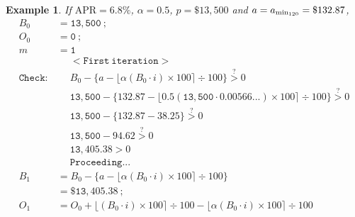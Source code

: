 \documentclass[12pt,letterpaper,oneside]{article}
\newtheorem{example}{Example}[section]
\theoremstyle{remark} %
\begin{document}
	\renewcommand{\rate}{0.00566...}
	\renewcommand{\proportion}{0.5}
	\renewcommand{\amount}{132.87}
	\renewcommand{\balance}{13,500}
	\renewcommand{\interest}{0}
	\renewcommand{\months}{0}
	\renewcommand{\monthsp}{1}
	\renewcommand{\balanceitb}{13,405.38}
	\renewcommand{\interestitb}{38.25}
	\renewcommand{\monthsitb}{1}
	\renewcommand{\monthspitb}{2}
	\renewcommand{\balanceitc}{13,310.49}
	\renewcommand{\interestitc}{76.23}
	\renewcommand{\monthsitc}{2}
	\renewcommand{\monthspitc}{3}
	\renewcommand{\balanceitf}{131.70}
	\renewcommand{\interestitf}{2,443.24}
	\renewcommand{\monthsitf}{119}
	\renewcommand{\monthspitf}{120}
	\renewcommand{\amountfinal}{2,575.69}
	\begin{example}
	If $\mbox{APR}=6.8\%$, $\alpha=0.5$, $p=\$13,500$ and $a=a_{\rm{min_{120}}}=\$132.87$,
	\scriptsize
	\begin{align*}
	B_{0}&=\mathtt{\balance}\ ;\\
	O_{0}&=\mathtt{\interest}\ ;\\
	m&=\mathtt{\monthsp}\\[12pt]
	&\quad\;\mathtt{<First\ iteration>}\\
	\mathtt{Check:}&\quad\;B_{\months}-\Big\{a-\big\lfloor{\alpha\left(B_{\months}\cdot i\right)\times 100}\big\rceil\div 100\Big\}\overset{?}{>}0\\[-6pt]
	&\quad\;\mathtt{\balance}-\Big\{\mathtt{\amount}-\big\lfloor{\mathtt{\proportion}\left(\mathtt{\balance}\cdot \mathtt{\rate}\right)\times 100}\big\rceil\div 100\Big\}\overset{?}{>}0\\[-6pt]
	&\quad\;\mathtt{\balance}-\Big\{\mathtt{\amount}-\mathtt{38.25}\Big\}\overset{?}{>}0\\[-6pt]
	&\quad\;\mathtt{\balance}-\mathtt{94.62}\overset{?}{>}0\\
	&\quad\;\mathtt{13,405.38}>0\\
	&\quad\;\mathtt{Proceeding...}\\[12pt]
	B_{\monthsp}&=B_{\months}-\Big\{a-\big\lfloor{\alpha\left(B_{\months}\cdot i\right)\times 100}\big\rceil\div 100\Big\}\\
	&=\mathtt{\$13,405.38}\ ;\\[12pt]
	O_{\monthsp}&=O_{\months}+\big\lfloor{\left(B_{\months}\cdot i\right)\times 100}\big\rceil\div 100-\big\lfloor{\alpha\left(B_{\months}\cdot i\right)\times 100}\big\rceil\div 100\\

\end{align*}
\end{example}
\end{document}
